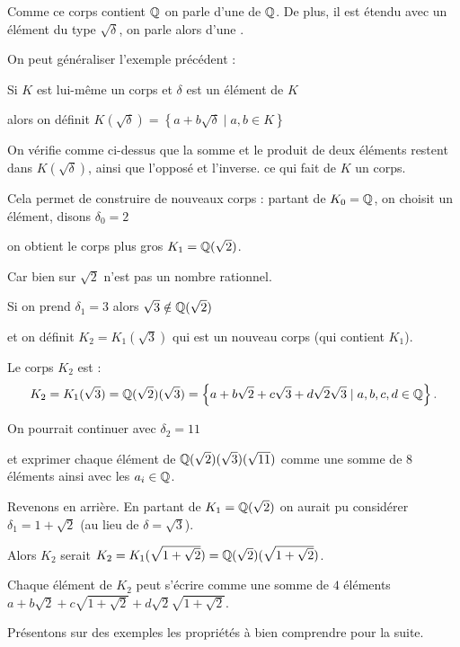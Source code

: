 \change
Comme ce corps contient $\mathbb{Q}$ on parle d'une  de $\mathbb{Q}$.
De plus, il est étendu avec un élément du type $\sqrt \delta$, on parle alors d'une .


\diapo

On peut généraliser l'exemple précédent : 

\change
Si $K$ est lui-même un corps et $\delta$ est un élément de $K$ 

\change
alors on définit 
$K(\sqrt \delta) = \left\{ a+b\sqrt \delta \mid a,b \in K \right\}$

On vérifie comme ci-dessus que la somme et le produit de deux éléments restent
dans $K(\sqrt \delta)$, ainsi que l'opposé et l'inverse.
ce qui fait de $K$ un corps. 


\change
Cela permet de construire de nouveaux corps :
partant de $K_0 = \mathbb{Q}$, on choisit un élément, disons $\delta_0 = 2$ 

\change
on obtient le corps plus gros $K_1 = \mathbb{Q}(\sqrt 2)$.

Car bien sur $\sqrt 2$ n'est pas un nombre rationnel.

\change
Si on prend $\delta_1 = 3$ alors $\sqrt 3 \notin \mathbb{Q}(\sqrt 2)$ 

\change 
et on définit $K_2 = K_1(\sqrt 3)$ qui est un nouveau corps (qui contient $K_1$).

\change
Le corps $K_2$ est :
$$K_2 = K_1(\sqrt 3) = \mathbb{Q}(\sqrt2)(\sqrt 3) 
= \left\{ a+b\sqrt 2 + c\sqrt 3 + d\sqrt 2 \sqrt 3 \mid a,b,c,d \in \mathbb{Q} \right\}.$$

\change
On pourrait continuer avec $\delta_2 = 11$ 

\change
et exprimer chaque élément de $\mathbb{Q}(\sqrt2)(\sqrt 3)(\sqrt {11})$ comme une somme
de $8$ éléments ainsi avec les $a_i\in \mathbb{Q}$.

\change
Revenons en arrière.
En partant de $K_1 = \mathbb{Q}(\sqrt 2)$ on aurait pu considérer $\delta_1=1+\sqrt2$ 
(au lieu de $\delta = \sqrt 3$).

\change
Alors $K_2$ serait $K_2=K_1(\sqrt{1+\sqrt2}) = \mathbb{Q}(\sqrt2)(\sqrt{1+\sqrt2})$. 


\change
Chaque élément de $K_2$ peut s'écrire comme une somme de $4$ éléments 
$a+b\sqrt 2 + c\sqrt{1+\sqrt2} + d\sqrt 2\sqrt{1+\sqrt2}$.


\diapo

Présentons sur des exemples les propriétés à bien comprendre pour la suite.

